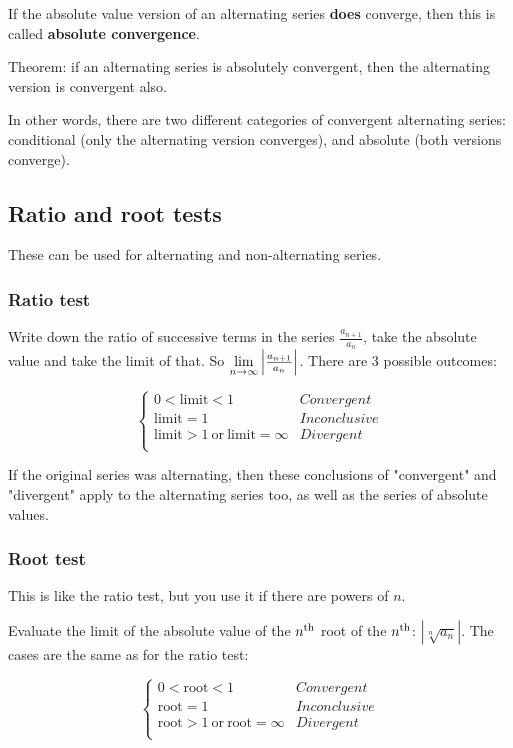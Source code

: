 If the absolute value version of an alternating series \textbf{does} converge, then this is called \textbf{absolute convergence}.

Theorem: if an alternating series is absolutely convergent, then the alternating version is convergent also.

In other words, there are two different categories of convergent alternating series: conditional (only the alternating version converges), and absolute (both versions converge).

\subsection{Ratio and root tests}

These can be used for alternating and non-alternating series.

\subsubsection{Ratio test}
Write down the ratio of successive terms in the series $\frac{a_{n+1}}{a_n}$, take the absolute value and take the limit of that. So $\lim\limits_{n \to \infty} \Big|\frac{a_{n+1}}{a_n}\Big|$. There are 3 possible outcomes:

$$
\begin{cases}
0 < \text{limit} < 1&Convergent\\
\text{limit} = 1&Inconclusive\\
\text{limit} > 1 ~\text{or}~ \text{limit} = \infty&Divergent\\
\end{cases}
$$

If the original series was alternating, then these conclusions of "convergent" and "divergent" apply to the alternating series too, as well as the series of absolute values.


\subsubsection{Root test}
This is like the ratio test, but you use it if there are powers of $n$.

Evaluate the limit of the absolute value of the $n^{\text{th}}$ root of the $n^{\text{th}}$: $|\sqrt[n]{a_n}|$. The cases are the same as for the ratio test:


$$
\begin{cases}
0 < \text{root} < 1&Convergent\\
\text{root} = 1&Inconclusive\\
\text{root} > 1 ~\text{or}~ \text{root} = \infty&Divergent\\
\end{cases}
$$


